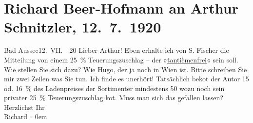 

         
         \renewcommand{\erwaehntePersonen}{Personen: Richard Beer-Hofmann, Samuel Fischer, Hugo von Hofmannsthal}
         \renewcommand{\erwaehnteOrte}{Orte: Bad Aussee, Wien}
         \renewcommand{\erwaehnteWerke}{}
               \section[Richard Beer-Hofmann an Arthur Schnitzler, 12. 7. 1920]{ Richard Beer-Hofmann an Arthur Schnitzler, 12. 7. 1920}\nopagebreak{}\rehead{ }\begin{ledgroupsized}[t]{13cm}\normalsize\beginnumbering{} \toendnotes[C]{\smallbreak\pagebreak[2]} 
\pstart
           {\pb}Bad Aussee12. VII.  20\pend
           \pstart
           Lieber Arthur! Eben erhalte ich von S. Fischer die Mitteilung von einem 25 {\%} Teuerungszuschlag – der »\uline{tantièmenfrei}« sein soll.
               Wie stellen Sie sich dazu? Wie Hugo, der ja
               noch in Wien ist. Bitte schreiben Sie mir zwei
               Zeilen was Sie tun. Ich finde es unerhört! Tatsächlich  beko{\geminationm}t der Autor 15 od. 16 {\%} des Ladenpreises der Sortimenter mindestens 50 wozu noch
               sein privater {\pb}25 {\%} Teuerungszuschlag ko{\geminationm}t. Muss
               man sich das gefallen lassen?\pend
           \pstart
           Herzlichst Ihr{\\[\baselineskip]}\spacefill\mbox{Richard}\pend
           \leftskip=0em{}
         
         \endnumbering{}\end{ledgroupsized}  \newcommand{\dateiname}{L02348}\newcommand{\titel}{Richard Beer-Hofmann an Arthur Schnitzler, 12. 7. 1920}\newcommand{\editorInnen}{Martin Anton Müller und Gerd-Hermann Susen}
      